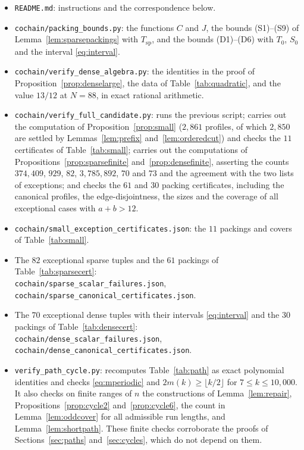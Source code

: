 \documentclass{amsart}
\theoremstyle{definition}
\theoremstyle{remark}
\numberwithin{equation}{section}
\numberwithin{table}{section}
\begin{document}
\begin{itemize}
\item \texttt{README.md}: instructions and the correspondence below.
\item \texttt{cochain/packing\_bounds.py}: the functions $C$ and $J$, the bounds (S1)--(S9) of Lemma~\ref{lem:sparsepackings} with $T_{\mathrm{sp}}$, and the bounds (D1)--(D6) with $T_0$, $S_0$ and the interval \eqref{eq:interval}.
\item \texttt{cochain/verify\_dense\_algebra.py}: the identities in the proof of Proposition~\ref{prop:denselarge}, the data of Table~\ref{tab:quadratic}, and the value $13/12$ at $N=88$, in exact rational arithmetic.
\item \texttt{cochain/verify\_full\_candidate.py}: runs the previous script; carries out the computation of Proposition~\ref{prop:small} ($2{,}861$ profiles, of which $2{,}850$ are settled by Lemmas~\ref{lem:prefix} and~\ref{lem:orderedcut}) and checks the $11$ certificates of Table~\ref{tab:small}; carries out the computations of Propositions~\ref{prop:sparsefinite} and~\ref{prop:densefinite}, asserting the counts $374{,}409$, $929$, $82$, $3{,}785{,}892$, $70$ and $73$ and the agreement with the two lists of exceptions; and checks the $61$ and $30$ packing certificates, including the canonical profiles, the edge-disjointness, the sizes and the coverage of all exceptional cases with $a+b>12$.
\item \texttt{cochain/small\_exception\_certificates.json}: the $11$ packings and covers of Table~\ref{tab:small}.
\item The $82$ exceptional sparse tuples and the $61$ packings of Table~\ref{tab:sparsecert}:\\
\texttt{cochain/sparse\_scalar\_failures.json},\\
\texttt{cochain/sparse\_canonical\_certificates.json}.
\item The $70$ exceptional dense tuples with their intervals \eqref{eq:interval} and the $30$ packings of Table~\ref{tab:densecert}:\\
\texttt{cochain/dense\_scalar\_failures.json},\\
\texttt{cochain/dense\_canonical\_certificates.json}.
\item \texttt{verify\_path\_cycle.py}: recomputes Table~\ref{tab:path} as exact polynomial identities and checks \eqref{eq:mperiodic} and $2m(k)\ge\lfloor k/2\rfloor$ for $7\le k\le10{,}000$. It also checks on finite ranges of $n$ the constructions of Lemma~\ref{lem:repair}, Propositions~\ref{prop:cycle2} and~\ref{prop:cycle6}, the count in Lemma~\ref{lem:oddcover} for all admissible run lengths, and Lemma~\ref{lem:shortpath}. These finite checks corroborate the proofs of Sections~\ref{sec:paths} and~\ref{sec:cycles}, which do not depend on them.
\end{itemize}
\end{document}
